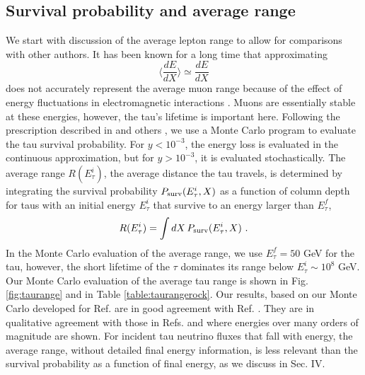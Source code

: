 \documentclass[aps,10pt,twocolumn,tightenlines]{revtex4-1}
\begin{document}
\subsection{Survival probability and  average range}

We start with discussion of the average lepton range to allow for 
 comparisons with other authors. 
It has been known for a long time that approximating
\begin{equation}
\label{eq:beta-approx}
\Biggl\langle\frac{dE}{dX}\Biggr\rangle\simeq \frac{dE}{dX}
\end{equation}
does not accurately represent the  average muon range because of the effect of energy fluctuations in electromagnetic interactions \cite{Lipari:1991ut}. Muons are essentially stable at these energies, however, the tau's lifetime is important here.
Following the prescription described in \cite{Lipari:1991ut} and others \cite{Antonioli:1997qw,Sokalski:2000nb,Chirkin:2004hz,Bigas:2008ff,Koehne:2013gpa}, we use a Monte Carlo program to evaluate the tau survival probability. For $y<10^{-3}$, the energy loss is evaluated in the continuous approximation, but for $y>10^{-3}$, it is evaluated stochastically. 
The average range $R(E_\tau^i)$, the average distance the tau travels, is determined by integrating the survival probability $P_{\rm surv}(E_\tau^i,X)$ as a function of column depth for taus with an initial energy $E_\tau^i$ that survive to an energy larger than $E_{\tau}^f$,
\begin{equation}
R(E_\tau^i)=\int dX\, P_{\rm surv}(E_\tau^i,X)\ .
\end{equation}
In the Monte Carlo evaluation of the average range, we use $E_{\tau}^f=50 $ GeV
for the tau, however, the short lifetime of the $\tau$ dominates its range below $E_\tau^i\sim 10^8 $ GeV. 
Our Monte Carlo evaluation of the  average tau range
is shown in Fig. \ref{fig:taurange} and in Table \ref{table:taurangerock}. 
Our results, based on our Monte Carlo developed for Ref. \cite{Dutta:2000hh} are in good agreement with 
Ref. \cite{Bigas:2008ff}. They are in qualitative agreement with those in 
 Refs. \cite{Chirkin:2004hz} and \cite{Koehne:2013gpa} where energies over many orders of magnitude are shown. For incident tau neutrino fluxes that fall with energy, the average range, without detailed final energy information, is less relevant than the survival probability as a function of final energy, as we discuss in Sec. IV.
\end{document}
